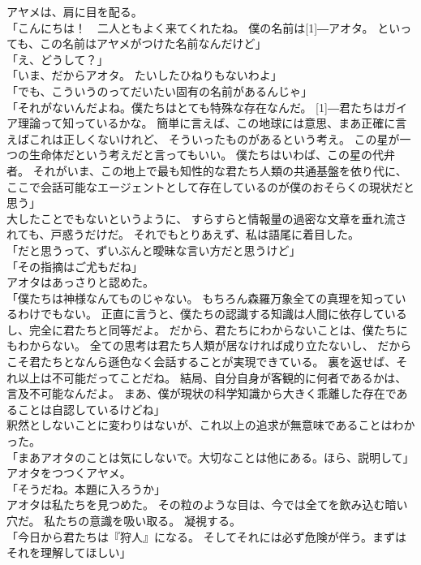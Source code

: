 \documentclass[../IHMain]{subfiles}
\begin{document}
アヤメは、肩に目を配る。\\
「こんにちは！　二人ともよく来てくれたね。
僕の名前は\scalebox{3}[1]{―}アオタ。
といっても、この名前はアヤメがつけた名前なんだけど」\\
「え、どうして？」\\
「いま、だからアオタ。
たいしたひねりもないわよ」\\
「でも、こういうのってだいたい固有の名前があるんじゃ」\\
「それがないんだよね。僕たちはとても特殊な存在なんだ。
\scalebox{3}[1]{―}君たちはガイア理論って知っているかな。
簡単に言えば、この地球には意思、まあ正確に言えばこれは正しくないけれど、
そういったものがあるという考え。
この星が一つの生命体だという考えだと言ってもいい。
僕たちはいわば、この星の代弁者。
それがいま、この地上で最も知性的な君たち人類の共通基盤を依り代に、
ここで会話可能なエージェントとして存在しているのが僕のおそらくの現状だと思う」\\
大したことでもないというように、
すらすらと情報量の過密な文章を垂れ流されても、戸惑うだけだ。
それでもとりあえず、私は語尾に着目した。\\
「だと思うって、ずいぶんと曖昧な言い方だと思うけど」\\
「その指摘はご尤もだね」\\
アオタはあっさりと認めた。\\
「僕たちは神様なんてものじゃない。
もちろん森羅万象全ての真理を知っているわけでもない。
正直に言うと、僕たちの認識する知識は人間に依存しているし、完全に君たちと同等だよ。
だから、君たちにわからないことは、僕たちにもわからない。
全ての思考は君たち人類が居なければ成り立たないし、
だからこそ君たちとなんら遜色なく会話することが実現できている。
裏を返せば、それ以上は不可能だってことだね。
結局、自分自身が客観的に何者であるかは、言及不可能なんだよ。
まあ、僕が現状の科学知識から大きく乖離した存在であることは自認しているけどね」\\
釈然としないことに変わりはないが、これ以上の追求が無意味であることはわかった。\\
「まあアオタのことは気にしないで。大切なことは他にある。ほら、説明して」\\
アオタをつつくアヤメ。\\
「そうだね。本題に入ろうか」\\
アオタは私たちを見つめた。
その粒のような目は、今では全てを飲み込む暗い穴だ。
私たちの意識を吸い取る。
凝視する。\\
「今日から君たちは『狩人』になる。
そしてそれには必ず危険が伴う。まずはそれを理解してほしい」\\
\end{document}
